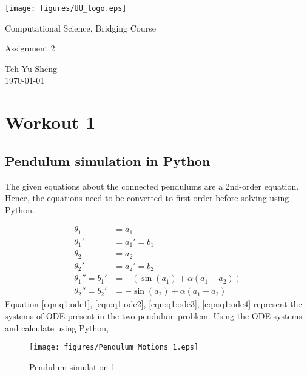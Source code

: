 \documentclass{article}
\begin{document}
\begin{titlepage}
  \begin{center}
    \texttt{[image: figures/UU\_logo.eps]}
  \end{center}
  \vspace{3em}
  \begin{center}
    \Large Computational Science, Bridging Course
  \end{center}
  \vspace{5em}
  \begin{center}
    \Large Assignment 2
  \end{center}
  \vspace{10em}
  \begin{center}
    Teh Yu Sheng \\[0.5em]
    \today
  \end{center}
\end{titlepage}


\section{Workout 1}%
\label{sec:Workout 1}
\subsection{Pendulum simulation in Python}%
\label{sub:Pendulum simulation in Python}
The given equations about the connected pendulums are a 2nd-order equation. Hence, the equations need to be converted to first order before solving using Python. 

\begin{align}
  \theta_1 &= a_1    \\
  \theta_1' &= a_1' = b_1 \\
  \theta_2 &= a_2  \label{eqn:q1:ode1} \\
  \theta_2' &= a_2' = b_2 \label{eqn:q1:ode2} \\
  \theta_1'' = b_1' &= -(\sin(a_1) + \alpha(a_1 - a_2)) \label{eqn:q1:ode3} \\
  \theta_2'' = b_2' &= -\sin(a_2) + \alpha(a_1 - a_2) \label{eqn:q1:ode4}
\end{align}
Equation \ref{eqn:q1:ode1}, \ref{eqn:q1:ode2}, \ref{eqn:q1:ode3}, \ref{eqn:q1:ode4} represent the systems of ODE present in the two pendulum problem. Using the ODE systems and calculate using Python,


\begin{figure}[H]
\centering
\texttt{[image: figures/Pendulum\_Motions\_1.eps]}
\caption{Pendulum simulation 1}
\label{fig:q1-pend-sim-1}
\end{figure}
\end{document}
